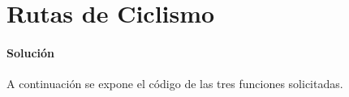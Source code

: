 \pagebreak[4]
\section{Rutas de Ciclismo}

  \paragraph{Solución}
  A continuación se expone el código
  de las tres funciones solicitadas.
  
  